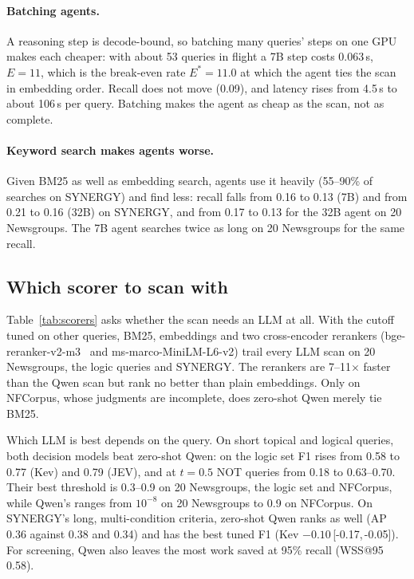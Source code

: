 \documentclass[sigconf,nonacm]{acmart}
\newcommand{\ci}[2]{\,[#1,\,#2]}
\begin{document}
\paragraph{Batching agents.}
A reasoning step is decode-bound, so batching many queries' steps on one GPU
makes each cheaper: with about 53 queries in flight a 7B step costs 0.063\,s,
$E=11$, which is the break-even rate $E^\ast = 11.0$ at which the agent ties the
scan in embedding order. Recall does not move (0.09), and latency rises from
4.5\,s to about 106\,s per query. Batching makes the agent as cheap as the scan,
not as complete.

\paragraph{Keyword search makes agents worse.}
Given BM25 as well as embedding search, agents use it heavily (55--90\% of
searches on SYNERGY) and find less: recall falls from 0.16 to 0.13 (7B) and
from 0.21 to 0.16 (32B) on SYNERGY, and from 0.17 to 0.13 for the 32B agent on
20 Newsgroups. The 7B agent searches twice as long on 20 Newsgroups for the
same recall.

\subsection{Which scorer to scan with}

Table~\ref{tab:scorers} asks whether the scan needs an LLM at all. With the
cutoff tuned on other queries, BM25, embeddings and two cross-encoder rerankers
(bge-reranker-v2-m3~\cite{chen2024bgem3} and ms-marco-MiniLM-L6-v2) trail every
LLM scan on 20 Newsgroups, the logic queries and SYNERGY. The rerankers are
7--11$\times$ faster than the Qwen scan but rank no better than plain
embeddings. Only on NFCorpus, whose judgments are incomplete, does zero-shot
Qwen merely tie BM25.

Which LLM is best depends on the query. On short topical and logical queries,
both decision models beat zero-shot Qwen: on the logic set F1 rises from 0.58 to
0.77 (Kev) and 0.79 (JEV), and at $t=0.5$ NOT queries from 0.18 to 0.63--0.70.
Their best threshold is 0.3--0.9 on 20 Newsgroups, the logic set and NFCorpus,
while Qwen's ranges from $10^{-8}$ on 20 Newsgroups to 0.9 on NFCorpus. On SYNERGY's long, multi-condition criteria,
zero-shot Qwen ranks as well (AP 0.36 against 0.38 and 0.34) and has the best
tuned F1 (Kev $-0.10$\ci{-0.17}{-0.05}). For screening, Qwen also leaves the
most work saved at 95\% recall (WSS@95~\cite{cohen2006wss} 0.58).
\end{document}
